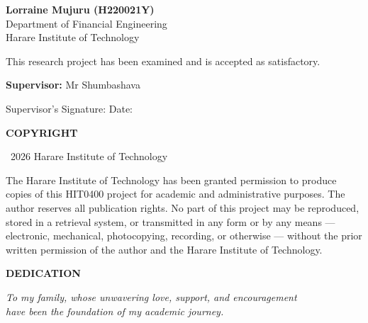 \documentclass[12pt,a4paper]{article}
\begin{document}
\noindent \textbf{Lorraine Mujuru (H220021Y)}\\
Department of Financial Engineering\\
Harare Institute of Technology

\vspace{2.5cm}

\noindent This research project has been examined and is accepted as satisfactory.

\vspace{2.5cm}

\noindent \textbf{Supervisor:} Mr Shumbashava

\vspace{0.8cm}
\noindent Supervisor's Signature: \underline{\hspace{5cm}} \hfill Date: \underline{\hspace{3.5cm}}

\newpage

\begin{center}
    {\LARGE\bfseries COPYRIGHT}
\end{center}
\vspace{1cm}

\textcopyright\ 2026 Harare Institute of Technology

\vspace{1cm}

The Harare Institute of Technology has been granted permission to produce copies of this HIT0400 project for academic and administrative purposes. The author reserves all publication rights. No part of this project may be reproduced, stored in a retrieval system, or transmitted in any form or by any means --- electronic, mechanical, photocopying, recording, or otherwise --- without the prior written permission of the author and the Harare Institute of Technology.

\newpage

\begin{center}
    {\LARGE\bfseries DEDICATION}
\end{center}
\vspace{3cm}

\begin{center}
    \textit{To my family, whose unwavering love, support, and encouragement\\
    have been the foundation of my academic journey.}
\end{center}
\end{document}
